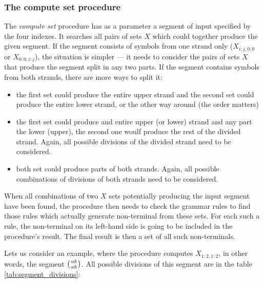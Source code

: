 \subsubsection{The compute set procedure}
The \textit{compute set} procedure has as a parameter a segment of input specified by the four indexes. It searches all pairs of sets $X$ which could together produce the given segment. If the segment consists of symbols from one strand only ($X_{i:j,0:0}$ or $X_{0:0,i:j}$), the situation is simpler --- it needs to consider the pairs of sets $X$ that produce the segment split in any two parts. If the segment contains symbols from both strands, there are more ways to split it:

\begin{itemize}
  \item{the first set could produce the entire upper strand and the second set could produce the entire lower strand, or the other way around (the order matters)}
  \item{the first set could produce and entire upper (or lower) strand and any part the lower (upper), the second one woulf produce the rest of the divided strand. Again, all possible divisions of the divided strand need to be considered.}
  \item{both set could produce parts of both strands. Again, all possible combinations of divisions of both strands need to be considered.}
\end{itemize}

When all combinations of two $X$ sets potentially producing the input segment have been found, the procedure then needs to check the grammar rules to find those rules which actually generate non-terminal from these sets. For each such a rule, the non-terminal on its left-hand side is going to be included in the procedure's result. The final result is then a set of all such non-terminals.

Lets us consider an example, where the procedure computes $X_{1:2,1:2}$, in other words, the segment $\wkpair{ab}{ab}$. All possible divisions of this segment are in the table \ref{tab:segment_divisions}:


